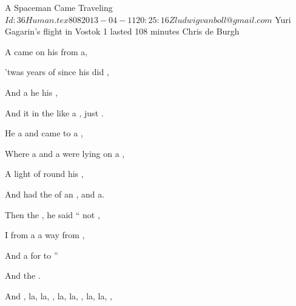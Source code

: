 \begin{SBSong}{A Spaceman Came Traveling }
  {$Id: 36Human.tex 808 2013-04-11 20:25:16Z ludwigvanboll@gmail.com $}
  {Yuri Gagarin's flight in Vostok 1 lasted 108 minutes}
  {Chris de Burgh}
  \begin{SBVerse}
	 A  came  on his  from a,
	
	 'twas  years of  since his did  ,
	
	 And  a  he  his ,
	
	 And it  in the  like a , just   .
  \end{SBVerse}
  \begin{SBVerse}
	 He  a  and came  to a ,
	
	 Where a  and a  were lying  on a , 
	
	 A  light of   round his ,
	
	 And  had the  of an , and   a.
  \end{SBVerse}
  \begin{SBVerse}
	 Then the  , he said `` not ,
	
	 I  from a  a  way from , 
	
	 And  a  for  to ''   
    
	 And  the     .
  \end{SBVerse}
  \begin{SBChorus}
	And   , la, la, , la, la, , la, la, , 
	

\end{SBChorus}
\end{SBSong}
